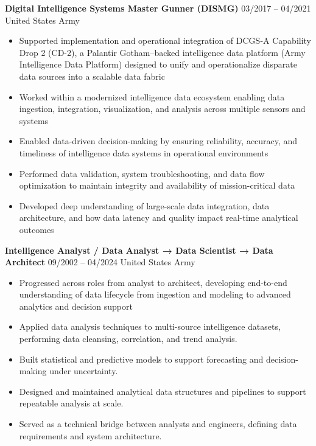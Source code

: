 \textbf{Digital Intelligence Systems Master Gunner (DISMG)} \hfill 03/2017 -- 04/2021 \\
United States Army
\begin{itemize}
	\item Supported implementation and operational integration of DCGS-A Capability Drop 2 (CD-2), a Palantir Gotham–backed intelligence data platform (Army Intelligence Data Platform) designed to unify and operationalize disparate data sources into a scalable data fabric 
	\item Worked within a modernized intelligence data ecosystem enabling data ingestion, integration, visualization, and analysis across multiple sensors and systems
	\item Enabled data-driven decision-making by ensuring reliability, accuracy, and timeliness of intelligence data systems in operational environments
	\item Performed data validation, system troubleshooting, and data flow optimization to maintain integrity and availability of mission-critical data
	\item Developed deep understanding of large-scale data integration, data architecture, and how data latency and quality impact real-time analytical outcomes   
\end{itemize}

\textbf{Intelligence Analyst / Data Analyst → Data Scientist → Data Architect} \hfill 09/2002 -- 04/2024
United States Army
\begin{itemize}
	\item Progressed across roles from analyst to architect, developing end-to-end understanding of data lifecycle from ingestion and modeling to advanced analytics and decision support  
	\item Applied data analysis techniques to multi-source intelligence datasets, performing data cleansing, correlation, and trend analysis.
	\item Built statistical and predictive models to support forecasting and decision-making under uncertainty.
	\item Designed and maintained analytical data structures and pipelines to support repeatable analysis at scale.
	\item Served as a technical bridge between analysts and engineers, defining data requirements and system architecture.
\end{itemize}
